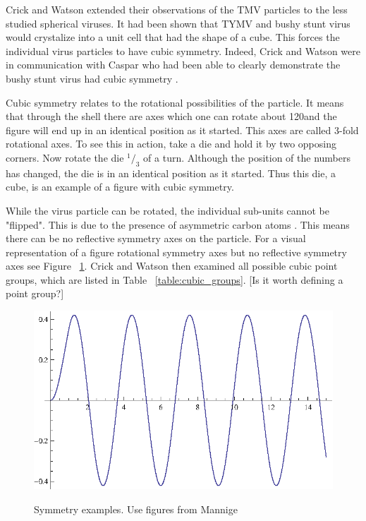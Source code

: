 \documentclass[12pt,letter]{article}
\newcommand*\rfrac[2]{{}^{#1}\!/_{#2}}
\begin{document}
Crick and Watson extended their observations of the TMV particles to the less studied spherical viruses. It had been shown that TYMV and bushy stunt virus would crystalize into a unit cell that had the shape of a cube. This forces the individual virus particles to have cubic symmetry. Indeed, Crick and Watson were in communication with Caspar who had been able to clearly demonstrate the bushy stunt virus had cubic symmetry \cite[p 474]{Crick:1956}. 

Cubic symmetry relates to the rotational possibilities of the particle. It means that through the shell there are axes which one can rotate about 120\degree and the figure will end up in an identical position as it started. This axes are called 3-fold rotational axes. To see this in action, take a die and hold it by two opposing corners. Now rotate the die $\rfrac{1}{3}$ of a turn. Although the position of the numbers has changed, the die is in an identical position as it started. Thus this die, a cube, is an example of a figure with cubic symmetry.

While the virus particle can be rotated, the individual sub-units cannot be "flipped". This is due to the presence of asymmetric carbon atoms \cite[p 474]{Crick:1956}. This means there can be no reflective symmetry axes on the particle. For a visual representation of a figure rotational symmetry axes but no reflective symmetry axes see Figure ~\ref{fig:reflect}. Crick and Watson then examined all possible cubic point groups, which are listed in Table ~\ref{table:cubic_groups}. [Is it worth defining a point group?]

\begin{figure}[h]
	\caption{Symmetry examples. Use figures from Mannige}
	\centering
	\includegraphics{place_holder.eps}
	\label{fig:reflect}
\end{figure}
\end{document}

